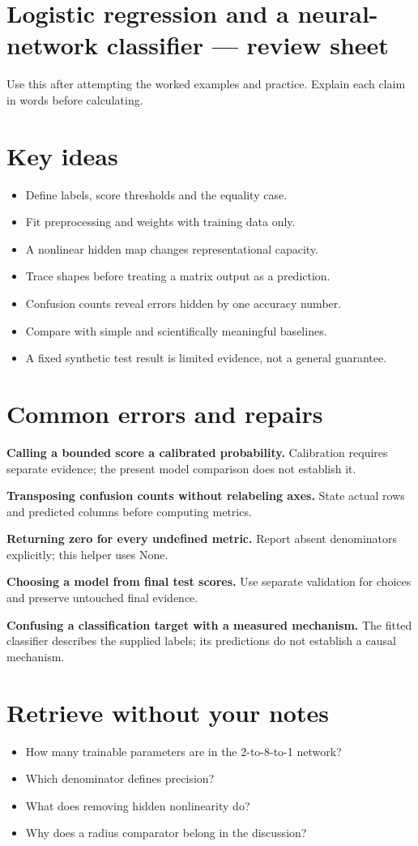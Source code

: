 \documentclass[11pt,letterpaper]{article}
\theoremstyle{definition}\newtheorem{definition}{Definition}\newtheorem{example}{Example}
\numberwithin{equation}{section}
\begin{document}
\section*{Logistic regression and a neural-network classifier --- review sheet}
Use this after attempting the worked examples and practice. Explain each claim in words before calculating.

\section*{Key ideas}
\begin{itemize}
\item Define labels, score thresholds and the equality case.
\item Fit preprocessing and weights with training data only.
\item A nonlinear hidden map changes representational capacity.
\item Trace shapes before treating a matrix output as a prediction.
\item Confusion counts reveal errors hidden by one accuracy number.
\item Compare with simple and scientifically meaningful baselines.
\item A fixed synthetic test result is limited evidence, not a general guarantee.
\end{itemize}
\section*{Common errors and repairs}
\textbf{Calling a bounded score a calibrated probability.} Calibration requires separate evidence; the present model comparison does not establish it.

\textbf{Transposing confusion counts without relabeling axes.} State actual rows and predicted columns before computing metrics.

\textbf{Returning zero for every undefined metric.} Report absent denominators explicitly; this helper uses None.

\textbf{Choosing a model from final test scores.} Use separate validation for choices and preserve untouched final evidence.

\textbf{Confusing a classification target with a measured mechanism.} The fitted classifier describes the supplied labels; its predictions do not establish a causal mechanism.

\section*{Retrieve without your notes}
\begin{itemize}
\item How many trainable parameters are in the 2-to-8-to-1 network?
\item Which denominator defines precision?
\item What does removing hidden nonlinearity do?
\item Why does a radius comparator belong in the discussion?
\end{itemize}
\end{document}
